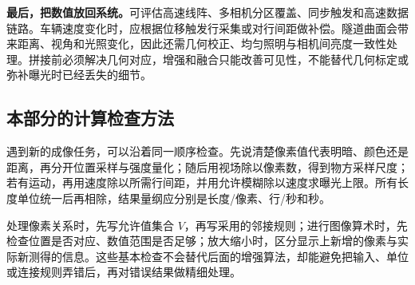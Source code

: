 \textbf{最后，把数值放回系统。}可评估高速线阵、多相机分区覆盖、同步触发和高速数据链路。车辆速度变化时，应根据位移触发行采集或对行间距做补偿。隧道曲面会带来距离、视角和光照变化，因此还需几何校正、均匀照明与相机间亮度一致性处理。拼接前必须解决几何对应，增强和融合只能改善可见性，不能替代几何标定或弥补曝光时已经丢失的细节。

\subsection{本部分的计算检查方法}

遇到新的成像任务，可以沿着同一顺序检查。先说清楚像素值代表明暗、颜色还是距离，再分开位置采样与强度量化；随后用视场除以像素数，得到物方采样尺度；若有运动，再用速度除以所需行间距，并用允许模糊除以速度求曝光上限。所有长度单位统一后再相除，结果量纲应分别是长度/像素、行/秒和秒。

处理像素关系时，先写允许值集合 $V$，再写采用的邻接规则；进行图像算术时，先检查位置是否对应、数值范围是否足够；放大缩小时，区分显示上新增的像素与实际新测得的信息。这些基本检查不会替代后面的增强算法，却能避免把输入、单位或连接规则弄错后，再对错误结果做精细处理。
